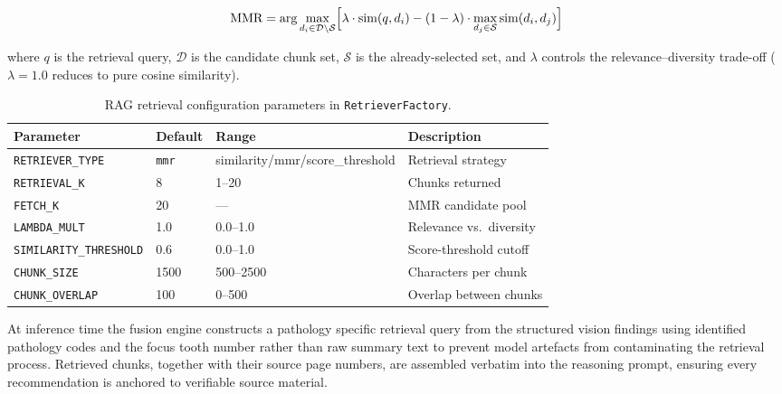 \documentclass[12pt,a4paper]{report}
\begin{document}
	\begin{equation}
		\text{MMR} = \arg\max_{d_i \in \mathcal{D}\setminus\mathcal{S}}
		\Bigl[\lambda \cdot \operatorname{sim}(q,d_i)
		- (1-\lambda) \cdot \max_{d_j \in \mathcal{S}} \operatorname{sim}(d_i,d_j)\Bigr]
		\label{eq:mmr}
	\end{equation}
	
	\noindent where $q$ is the retrieval query, $\mathcal{D}$ is the candidate chunk set,
	$\mathcal{S}$ is the already-selected set, and $\lambda$ controls the relevance--diversity
	trade-off ($\lambda = 1.0$ reduces to pure cosine similarity).
	
	\begin{table}[H]
		\centering
		\caption{RAG retrieval configuration parameters in \texttt{RetrieverFactory}.}
		\label{tab:retrieval_config}
		\begin{tabular}{llll}
			\toprule
			\textbf{Parameter} & \textbf{Default} & \textbf{Range} & \textbf{Description} \\
			\midrule
			\texttt{RETRIEVER\_TYPE}      & \texttt{mmr}  & similarity/mmr/score\_threshold & Retrieval strategy \\
			\texttt{RETRIEVAL\_K}         & 8             & 1--20           & Chunks returned \\
			\texttt{FETCH\_K}             & 20            & ---             & MMR candidate pool \\
			\texttt{LAMBDA\_MULT}         & 1.0           & 0.0--1.0        & Relevance vs.\ diversity \\
			\texttt{SIMILARITY\_THRESHOLD}& 0.6           & 0.0--1.0        & Score-threshold cutoff \\
			\texttt{CHUNK\_SIZE}          & 1500          & 500--2500       & Characters per chunk \\
			\texttt{CHUNK\_OVERLAP}       & 100           & 0--500          & Overlap between chunks \\
			\bottomrule
		\end{tabular}
	\end{table}
	
	
	At inference time the fusion engine constructs a pathology specific retrieval query from
	the structured vision findings using identified pathology codes and the focus tooth number
	rather than raw summary text to prevent model artefacts from contaminating the retrieval
	process. Retrieved chunks, together with their source page numbers, are assembled verbatim
	into the reasoning prompt, ensuring every recommendation is anchored to verifiable source
	material.
	
\end{document}
